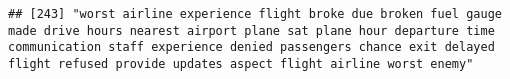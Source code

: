 \documentclass[
]{article}
\begin{document}
\begin{verbatim}
## [243] "worst airline experience flight broke due broken fuel gauge made drive hours nearest airport plane sat plane hour departure time communication staff experience denied passengers chance exit delayed flight refused provide updates aspect flight airline worst enemy"                                                                                                                                                                                                                                                                                                                                                                                                                                                                                                                                                                                                                                                                                                                                                                                                                                                                                                                                                                                                                                                                                                                                                                                                                                                                                                                                                                                                                                                                                                                        

\end{verbatim}
\end{document}
